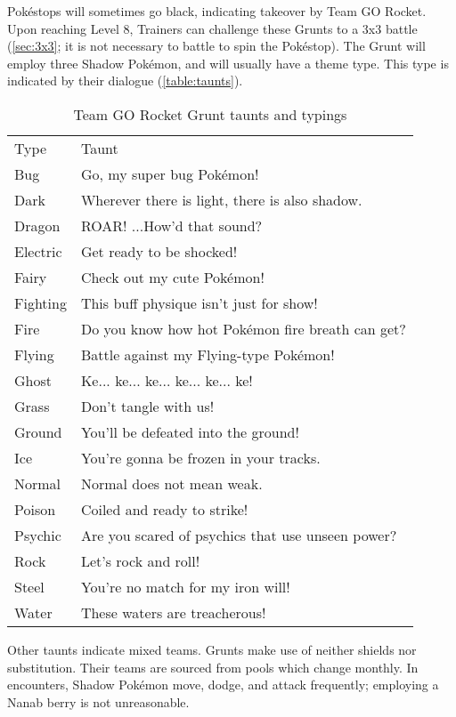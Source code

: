 Pokéstops will sometimes go black, indicating takeover by Team GO Rocket.
Upon reaching Level 8, Trainers can challenge these Grunts to a 3x3 battle (\autoref{sec:3x3};
 it is not necessary to battle to spin the Pokéstop).
The Grunt will employ three Shadow Pokémon, and will usually have a theme type.
This type is indicated by their dialogue (\autoref{table:taunts}).
\begin{table}
\footnotesize
\centering
\begin{tabular}{ll}
Type & Taunt\\
\Midrule
  Bug & Go, my super bug Pokémon!\\
  Dark & Wherever there is light, there is also shadow.\\
  Dragon & ROAR! ...How'd that sound?\\
  Electric & Get ready to be shocked!\\
  Fairy & Check out my cute Pokémon!\\
  Fighting & This buff physique isn't just for show!\\
  Fire & Do you know how hot Pokémon fire breath can get?\\
  Flying & Battle against my Flying-type Pokémon!\\
  Ghost & Ke... ke... ke... ke... ke... ke!\\
  Grass & Don't tangle with us!\\
  Ground & You'll be defeated into the ground!\\
  Ice & You're gonna be frozen in your tracks.\\
  Normal & Normal does not mean weak.\\
  Poison & Coiled and ready to strike!\\
  Psychic & Are you scared of psychics that use unseen power?\\
  Rock & Let's rock and roll!\\
  Steel & You're no match for my iron will!\\
  Water & These waters are treacherous!\\
\end{tabular}
\caption{Team GO Rocket Grunt taunts and typings\label{table:taunts}}
\end{table}
Other taunts indicate mixed teams.
Grunts make use of neither shields nor substitution.
Their teams are sourced from pools which change monthly.
In encounters, Shadow Pokémon move, dodge, and attack frequently; employing a Nanab berry is not unreasonable.

